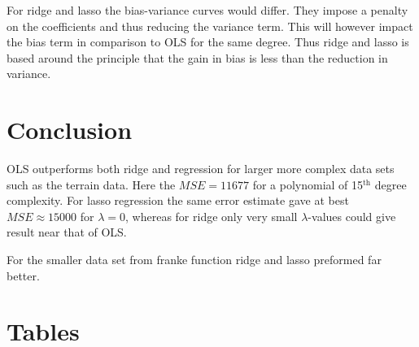 \documentclass[uio,jmp,amsmath,amssymb,reprint,nofootinbib]{revtex4-1}
\numberwithin{equation}{section}
\begin{document}
For ridge and lasso the bias-variance curves would differ. They impose a penalty on the coefficients and thus reducing the variance term. This will however impact the bias term in comparison to OLS for the same degree. Thus ridge and lasso is based around the principle that the gain in bias is less than the reduction in variance.

\section{Conclusion}\label{sec:Conclusion}

OLS outperforms both ridge and regression for larger more complex data sets such as the terrain data. Here the \(MSE=11677\) for a polynomial of 15\(^\text{th}\) degree complexity. For lasso regression the same error estimate gave at best \(MSE\approx 15000\) for \(\lambda = 0\), whereas for ridge only very small \(\lambda\)-values could give result near that of OLS.

For the smaller data set from franke function ridge and lasso preformed far better.

\appendix

\section{Tables}
\end{document}

